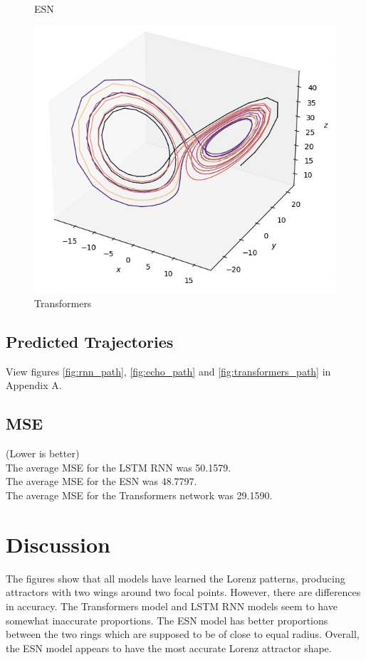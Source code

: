 \documentclass[11pt]{article}
\begin{document}
\begin{figure}[ht]
\begin{minipage}{0.32\textwidth}
        \caption{ESN}
        \label{fig:echo_lorenz}
    \end{minipage}
    \hfill
    \begin{minipage}{0.32\textwidth}
        \centering
        \includegraphics[width=\textwidth]{transformers_lorenz.jpeg}
        \caption{Transformers}
        \label{fig:transformers_lorenz}
    \end{minipage}
\end{figure}

\subsection{Predicted Trajectories}
View figures \ref{fig:rnn_path}, \ref{fig:echo_path} and \ref{fig:transformers_path} in Appendix A.
\subsection{MSE}
(Lower is better) \\
The average MSE for the LSTM RNN was 50.1579. \\
The average MSE for the ESN was 48.7797. \\
The average MSE for the Transformers network was 29.1590. 
\section{Discussion}
The figures show that all models have learned the Lorenz patterns, producing attractors with two wings around two focal points. However, there are differences in accuracy. The Transformers model and LSTM RNN models seem to have somewhat inaccurate proportions. The ESN model has better proportions between the two rings which are supposed to be of close to equal radius. Overall, the ESN model appears to have the most accurate Lorenz attractor shape.
\end{document}
